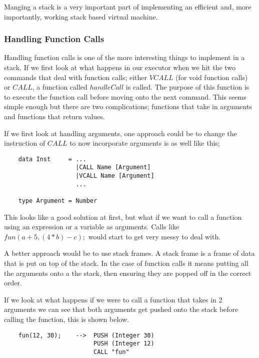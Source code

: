 Manging a stack is a very important part of implementing an efficient and, more importantly, working stack based virtual machine. 

\subsubsection{Handling Function Calls}

Handling function calls is one of the more interesting things to implement in a stack. If we first look at what happens in our executor when we hit the two commands that deal with function calls; either $VCALL$ (for void function calls) or $CALL$, a function called $handleCall$  is called. The purpose of this function is to execute the function call before moving onto the next command. This seems simple enough but there are two complications; functions that take in arguments and functions that return values.

If we first look at handling arguments, one approach could be to change the instruction of $CALL$ to now incorporate arguments is as well like this;

\begin{lstlisting}
	data Inst     = ...
	                |CALL Name [Argument]
	                |VCALL Name [Argument]
	                ...
				
	type Argument = Number
\end{lstlisting}        

This looks like a good solution at first,  but what if we want to call a function using an expression or a variable as arguments. Calls like $fun(a+5,(4*b)-c);$ would start to get very messy to deal with. 

A better approach would be to use stack frames. A stack frame is a frame of data that is put on top of the stack. In the case of function calls it means putting all the arguments onto a the stack, then ensuring they are popped off in the correct order.   

If we look at what happens if we were to call a function that takes in 2 arguments we can see that both arguments get pushed onto the stack before calling the function, this is shown below.

\begin{lstlisting}
	fun(12, 30); 	-->  PUSH (Integer 30)
	                     PUSH (Integer 12)
        	             CALL "fun"	
\end{lstlisting}

